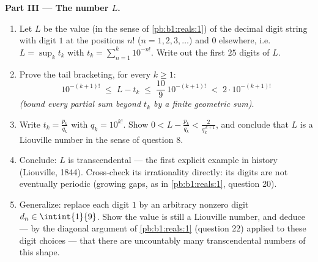 \begin{problem}
\medskip
\noindent\textbf{Part III --- The number $L$.}
\begin{enumerate}[resume]
  \item Let $L$ be the value (in the sense of
        \cref{pb:b1:reals:1}) of the decimal digit string with
        digit $1$ at the positions $n!$ ($n = 1, 2, 3, \dots$)
        and $0$ elsewhere, i.e.\ $L = \sup_k t_k$ with $t_k =
        \sum_{n=1}^{k} 10^{-n!}$. Write out the first $25$
        digits of $L$.
  \item Prove the tail bracketing, for every $k \geq 1$:
        \[
        10^{-(k+1)!} \;\leq\; L - t_k \;\leq\;
        \frac{10}{9}\,10^{-(k+1)!} \;<\; 2\cdot 10^{-(k+1)!}
        \]
        \emph{(bound every partial sum beyond $t_k$ by a finite
        geometric sum)}.
  \item Write $t_k = \frac{p_k}{q_k}$ with $q_k = 10^{k!}$.
        Show $0 < L - \frac{p_k}{q_k} < \frac{2}{q_k^{\,k+1}}$,
        and conclude that $L$ is a Liouville number in the sense
        of question 8.
  \item Conclude: $L$ is transcendental --- the first explicit
        example in history (Liouville, 1844). Cross-check its
        irrationality directly: its digits are not eventually
        periodic (growing gaps, as in \cref{pb:b1:reals:1},
        question 20).
  \item Generalize: replace each digit $1$ by an arbitrary
        nonzero digit $d_n \in \intint{1}{9}$. Show the value is
        still a Liouville number, and deduce --- by the diagonal
        argument of \cref{pb:b1:reals:1} (question 22) applied
        to these digit choices --- that there are uncountably
        many transcendental numbers of this shape.
\end{enumerate}


\end{problem}
